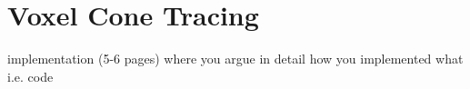 \newpage
\section{Voxel Cone Tracing}\par

implementation (5-6 pages) where you argue in detail how you implemented what i.e. code